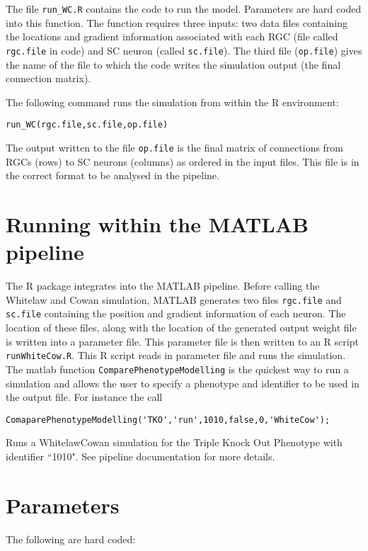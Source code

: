 \documentclass[a4paper,12pt]{article}
\begin{document}
The file \verb=run_WC.R= contains the code to run the model. Parameters are hard coded into this function. The function requires three inputs: two data files containing the locations and gradient information associated with each RGC (file called \verb=rgc.file= in code) and SC neuron (called \verb=sc.file=). The third file (\verb=op.file=) gives the name of the file to which the code writes the simulation output (the final connection matrix). 

The following command runs the simulation from within the R environment:

\begin{verbatim}
run_WC(rgc.file,sc.file,op.file)
\end{verbatim}

The output written to the file \verb=op.file= is the final matrix of connections from RGCs (rows) to SC neurons (columns) as ordered in the input files. This file is in the correct format to be analysed in the pipeline. 

\section{Running within the MATLAB pipeline}
The R package integrates into the MATLAB pipeline. Before calling the Whitelaw and Cowan simulation, MATLAB generates two files \verb=rgc.file= and \verb=sc.file= containing the position and gradient information of each neuron. The location of these files, along with the location of the generated output weight file is written into a parameter file. This parameter file is then written to an R script \verb=runWhiteCow.R=. This R script reads in parameter file and runs the simulation. The matlab function \verb=ComparePhenotypeModelling= is the quickest way to run a simulation and allows the user to specify a phenotype and identifier to be used in the output file. For instance the call

\begin{verbatim}
ComaparePhenotypeModelling('TKO','run',1010,false,0,'WhiteCow');
\end{verbatim}

Runs a WhitelawCowan simulation for the Triple Knock Out Phenotype with identifier ``1010". See pipeline documentation for more details. 

\section{Parameters}
 The following are hard coded:
\end{document}
